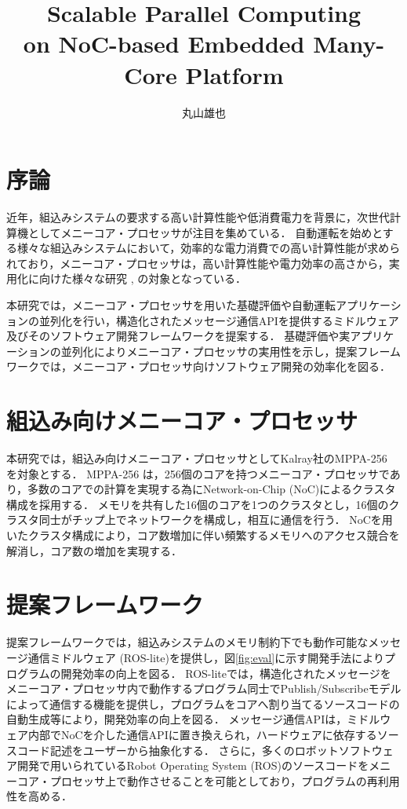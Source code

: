 \documentclass[a4j,10pt,twocolumn]{abstract}
\title{Scalable Parallel Computing \\ on NoC-based Embedded Many-Core Platform}	%
\author{丸山雄也} 		%
\begin{document}
\absttitle 		%

\section{序論}
近年，組込みシステムの要求する高い計算性能や低消費電力を背景に，次世代計算機としてメニーコア・プロセッサが注目を集めている．
自動運転を始めとする様々な組込みシステムにおいて，効率的な電力消費での高い計算性能が求められており，メニーコア・プロセッサは，高い計算性能や電力効率の高さから，実用化に向けた様々な研究 \cite{BURGIO20172992}, \cite{de2013clustered2} の対象となっている．

本研究では，メニーコア・プロセッサを用いた基礎評価や自動運転アプリケーションの並列化を行い，構造化されたメッセージ通信APIを提供するミドルウェア及びそのソフトウェア開発フレームワークを提案する．
基礎評価や実アプリケーションの並列化によりメニーコア・プロセッサの実用性を示し，提案フレームワークでは，メニーコア・プロセッサ向けソフトウェア開発の効率化を図る．

\section{組込み向けメニーコア・プロセッサ}
本研究では，組込み向けメニーコア・プロセッサとしてKalray社のMPPA-256 \cite{de2013clustered2} を対象とする．
MPPA-256 は，256個のコアを持つメニーコア・プロセッサであり，多数のコアでの計算を実現する為にNetwork-on-Chip (NoC)によるクラスタ構成を採用する．
メモリを共有した16個のコアを1つのクラスタとし，16個のクラスタ同士がチップ上でネットワークを構成し，相互に通信を行う．
NoCを用いたクラスタ構成により，コア数増加に伴い頻繁するメモリへのアクセス競合を解消し，コア数の増加を実現する．

\section{提案フレームワーク}
提案フレームワークでは，組込みシステムのメモリ制約下でも動作可能なメッセージ通信ミドルウェア (ROS-lite)を提供し，図\ref{fig:eval}に示す開発手法によりプログラムの開発効率の向上を図る．
ROS-liteでは，構造化されたメッセージをメニーコア・プロセッサ内で動作するプログラム同士でPublish/Subscribeモデルによって通信する機能を提供し，プログラムをコアへ割り当てるソースコードの自動生成等により，開発効率の向上を図る．
メッセージ通信APIは，ミドルウェア内部でNoCを介した通信APIに置き換えられ，ハードウェアに依存するソースコード記述をユーザーから抽象化する．
さらに，多くのロボットソフトウェア開発で用いられているRobot Operating System (ROS)のソースコードをメニーコア・プロセッサ上で動作させることを可能としており，プログラムの再利用性を高める．
\end{document}
